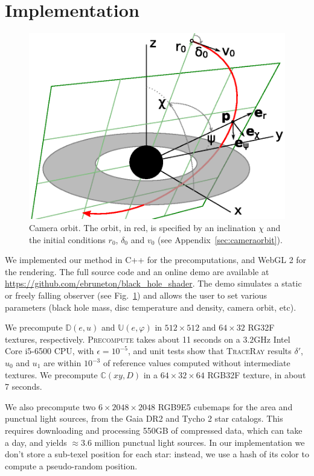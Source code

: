 \documentclass{document}
\begin{document}
\section{Implementation}\label{sec:implem}

\begin{figure}[t]
	\centering
	\includegraphics[width=\linewidth]{figures/orbit}
	\caption{\label{fig:orbit}Camera orbit. The orbit, in red, is specified by 
	an inclination $\chi$ and the initial conditions $r_0$, $\delta_0$ and $v_0$ 
	(see Appendix~\ref{sec:cameraorbit}).}
\end{figure}

We implemented our method in C++ for the precomputations, and WebGL 2 for the 
rendering. The full source code and an online demo are available at 
\url{https://github.com/ebruneton/black_hole_shader}. The demo simulates a 
static or freely falling observer (see Fig.~\ref{fig:orbit}) and allows the 
user to set various parameters (black hole mass, disc temperature and density, 
camera orbit, etc).

We precompute $\mathbb{D}(e, u)$ and $\mathbb{U}(e, \varphi)$ in $512 \times 
512$ and $64 \times 32$ RG32F textures, respectively. \textsc{Precompute} takes 
about 11 seconds on a $3.2$GHz Intel Core i5-6500 CPU, with $\epsilon = 
10^{-5}$, and unit tests show that \textsc{TraceRay} results $\delta'$, $u_0$ 
and $u_1$ are within $10^{-3}$ of reference values computed without 
intermediate textures. We precompute $\mathbb{C}(xy, D)$ in a $64 \times 32 
\times 64$ RGB32F texture, in about 7 seconds.

We also precompute two $6 \times 2048 \times 2048$ RGB9E5 cubemaps for the area 
and punctual light sources, from the Gaia DR2 \cite{gaiadr22018} and Tycho 2
\cite{tycho2000} star catalogs. This requires downloading and processing 550GB 
of compressed data, which can take a day, and yields $\approx 3.6$ million 
punctual light sources. In our implementation we don't store a sub-texel
position for each star: instead, we use a hash of its color to compute a 
pseudo-random position.
\end{document}
